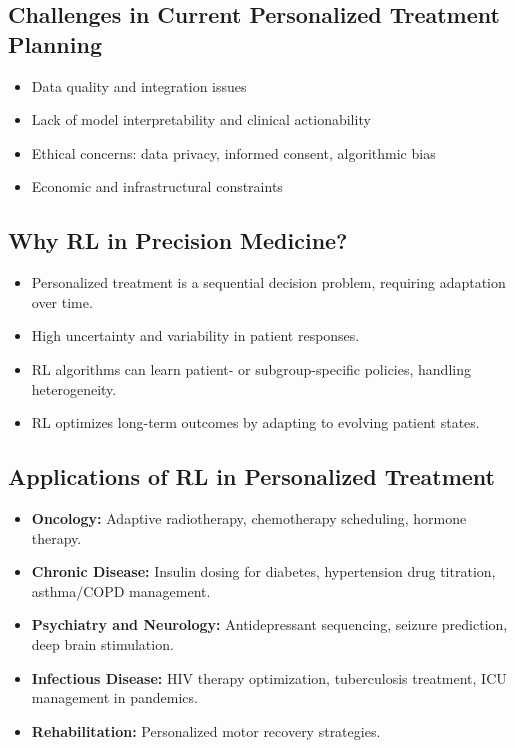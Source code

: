 \subsection*{Challenges in Current Personalized Treatment Planning}
\begin{itemize}
    \item Data quality and integration issues
    \item Lack of model interpretability and clinical actionability
    \item Ethical concerns: data privacy, informed consent, algorithmic bias
    \item Economic and infrastructural constraints
\end{itemize}

\subsection*{Why RL in Precision Medicine?}
\begin{itemize}
    \item Personalized treatment is a sequential decision problem, requiring adaptation over time.
    \item High uncertainty and variability in patient responses.
    \item RL algorithms can learn patient- or subgroup-specific policies, handling heterogeneity.
    \item RL optimizes long-term outcomes by adapting to evolving patient states.
\end{itemize}

\subsection*{Applications of RL in Personalized Treatment}
\begin{itemize}
    \item \textbf{Oncology:} Adaptive radiotherapy, chemotherapy scheduling, hormone therapy.
    \item \textbf{Chronic Disease:} Insulin dosing for diabetes, hypertension drug titration, asthma/COPD management.
    \item \textbf{Psychiatry and Neurology:} Antidepressant sequencing, seizure prediction, deep brain stimulation.
    \item \textbf{Infectious Disease:} HIV therapy optimization, tuberculosis treatment, ICU management in pandemics.
    \item \textbf{Rehabilitation:} Personalized motor recovery strategies.
\end{itemize}

